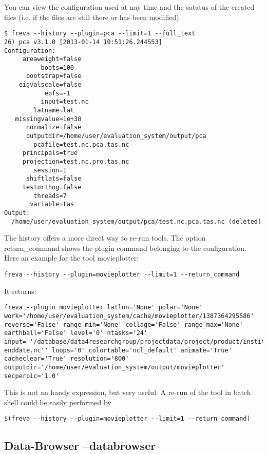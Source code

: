 \documentclass[a4paper,11pt]{ltxdoc}
\begin{document}
You can view the configuration used at nay time and the satatus of the created files (i.e. if the files are still there or has been modified)
\begin{lstlisting}
$ freva --history --plugin=pca --limit=1 --full_text
26) pca v3.1.0 [2013-01-14 10:51:26.244553] 
Configuration:
     areaweight=false
          boots=100
      bootstrap=false
    eigvalscale=false
           eofs=-1
          input=test.nc
        latname=lat
   missingvalue=1e+38
      normalize=false
      outputdir=/home/user/evaluation_system/output/pca
        pcafile=test.nc.pca.tas.nc
     principals=true
     projection=test.nc.pro.tas.nc
        session=1
      shiftlats=false
     testorthog=false
        threads=7
       variable=tas
Output:
  /home/user/evaluation_system/output/pca/test.nc.pca.tas.nc (deleted)
\end{lstlisting}
The history offers a more direct way to re-run tools. The option return\_command shows the plugin command belonging to the configuration. Here an example for the tool movieplotter:
\begin{lstlisting}
freva --history --plugin=movieplotter --limit=1 --return_command
\end{lstlisting}

It returns:
\begin{lstlisting}
freva --plugin movieplotter latlon='None' polar='None' work='/home/user/evaluation_system/cache/movieplotter/1387364295586' reverse='False' range_min='None' collage='False' range_max='None' earthball='False' level='0' ntasks='24' input=''/database/data4researchgroup/projectdata/project/product/institute/model/experiment/time_frequency/realm/variable/ensemble/variable_CMORtable_model_experiment_ensemble_startdate-enddate.nc'' loops='0' colortable='ncl_default' animate='True' cacheclear='True' resolution='800' outputdir='/home/user/evaluation_system/output/movieplotter' secperpic='1.0'
\end{lstlisting}

This is not an handy expression, but very useful. A re-run of the tool in batch shell could be easily performed by
\begin{lstlisting}
$(freva --history --plugin=movieplotter --limit=1 --return_command)
\end{lstlisting}

\subsection{Data-Browser --databrowser}
\end{document}

